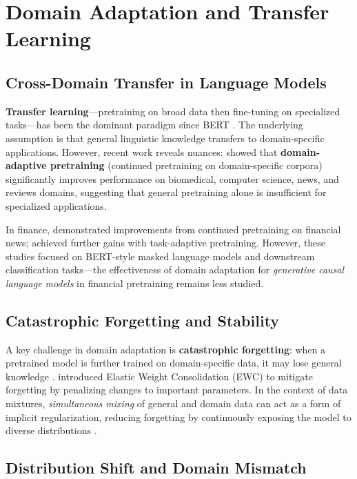 \section{Domain Adaptation and Transfer Learning}

\subsection{Cross-Domain Transfer in Language Models}

\textbf{Transfer learning}---pretraining on broad data then fine-tuning on specialized tasks---has been the dominant paradigm since BERT \parencite{devlin2019bert}. The underlying assumption is that general linguistic knowledge transfers to domain-specific applications. However, recent work reveals nuances: \textcite{gururangan2020don} showed that \textbf{domain-adaptive pretraining} (continued pretraining on domain-specific corpora) significantly improves performance on biomedical, computer science, news, and reviews domains, suggesting that general pretraining alone is insufficient for specialized applications.

In finance, \textcite{araci2019finbert} demonstrated improvements from continued pretraining on financial news; \textcite{yang2020finbert} achieved further gains with task-adaptive pretraining. However, these studies focused on BERT-style masked language models and downstream classification tasks---the effectiveness of domain adaptation for \textit{generative causal language models} in financial pretraining remains less studied.

\subsection{Catastrophic Forgetting and Stability}

A key challenge in domain adaptation is \textbf{catastrophic forgetting}: when a pretrained model is further trained on domain-specific data, it may lose general knowledge \parencite{mccloskey1989catastrophic, french1999catastrophic}. \textcite{kirkpatrick2017overcoming} introduced Elastic Weight Consolidation (EWC) to mitigate forgetting by penalizing changes to important parameters. In the context of data mixtures, \textit{simultaneous mixing} of general and domain data can act as a form of implicit regularization, reducing forgetting by continuously exposing the model to diverse distributions \parencite{lee2022surgical}.

\subsection{Distribution Shift and Domain Mismatch}

